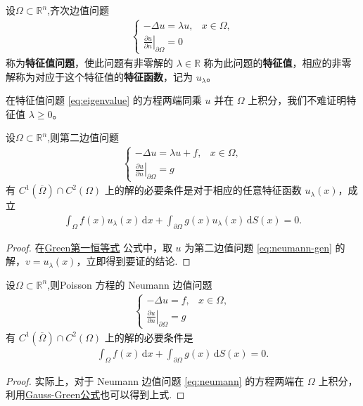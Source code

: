 \documentclass[../../main.tex]{subfiles}%
\begin{document}
\begin{definition}
设$\Omega \subset \mathbb{R}^n$,齐次边值问题
\begin{align}
\begin{cases}
-\Delta u = \lambda u, & x\in\Omega, \\
\left.\frac{\partial u}{\partial n}\right|_{\partial\Omega} = 0
\end{cases} \label{eq:eigenvalue}
\end{align}
称为\textbf{特征值问题}，使此问题有非零解的 $\lambda\in\mathbb{R}$ 称为此问题的\textbf{特征值}，相应的非零解称为对应于这个特征值的\textbf{特征函数}，记为 $u_\lambda$。
\end{definition}
\begin{remark}
在特征值问题 \eqref{eq:eigenvalue} 的方程两端同乘 $u$ 并在 $\Omega$ 上积分，我们不难证明特征值 $\lambda\geqslant 0$。
\end{remark}

\begin{theorem}
设$\Omega \subset \mathbb{R}^n$,则第二边值问题
\begin{align}
\begin{cases}
-\Delta u = \lambda u + f, & x\in\Omega, \\
\left.\frac{\partial u}{\partial n}\right|_{\partial\Omega} = g
\end{cases} \label{eq:neumann-gen}
\end{align}
有 $C^1(\overline{\Omega})\cap C^2(\Omega)$ 上的解的必要条件是对于相应的任意特征函数 $u_\lambda(x)$，成立
\begin{align}
\int_\Omega f(x)u_\lambda(x)\,\mathrm{d}x + \int_{\partial\Omega} g(x)u_\lambda(x)\,\mathrm{d}S(x) = 0. \label{eq:neumann-cond}
\end{align}
\end{theorem}

\begin{proof}
在\hyperref[Basis of Analytics-theorem:Green第一恒等式]{Green第一恒等式} 公式中，取 $u$ 为第二边值问题 \eqref{eq:neumann-gen} 的解，$v=u_\lambda(x)$，立即得到要证的结论.
\end{proof}

\begin{corollary}
设$\Omega \subset \mathbb{R}^n$,则Poisson 方程的 Neumann 边值问题
\begin{align}
\begin{cases}
-\Delta u = f, & x\in\Omega, \\
\left.\frac{\partial u}{\partial n}\right|_{\partial\Omega} = g
\end{cases} \label{eq:neumann}
\end{align}
有 $C^1(\overline{\Omega})\cap C^2(\Omega)$ 上的解的必要条件是
\begin{align}
\int_\Omega f(x)\,\mathrm{d}x + \int_{\partial\Omega} g(x)\,\mathrm{d}S(x) = 0. \label{eq:neumann-cond0}
\end{align}
\end{corollary}
\begin{proof}
实际上，对于 Neumann 边值问题 \eqref{eq:neumann} 的方程两端在 $\Omega$ 上积分，利用\hyperref[Basis of Analytics-theorem:Gauss-Green公式(散度定理)]{Gauss-Green公式}也可以得到上式.
\end{proof}
\end{document}
